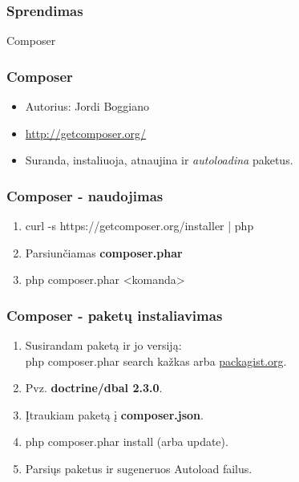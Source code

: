 \documentclass[12pt,a4paper]{beamer}
\begin{document}
\begin{frame}[fragile]
    \frametitle{Sprendimas}

    {\Huge Composer}
\end{frame}

\begin{frame}
    \frametitle{Composer}

    \begin{itemize}
        \item Autorius: Jordi Boggiano
        \item \url{http://getcomposer.org/}
        \item Suranda, instaliuoja, atnaujina ir \textit{autoloadina} paketus.
    \end{itemize}
\end{frame}

\begin{frame}
    \frametitle{Composer - naudojimas}
        \begin{enumerate}
            \item {\color{orange}curl -s https://getcomposer.org/installer | php} 
            \item Parsiunčiamas \textbf{composer.phar}
            \item {\color{orange}php composer.phar <komanda>}
        \end{enumerate}
\end{frame}

\begin{frame}
    \frametitle{Composer - paketų instaliavimas}

    \begin{enumerate}
        \item Susirandam paketą ir jo versiją:\\{\color{orange}php composer.phar search kažkas} arba \url{packagist.org}.
        \item Pvz. \textbf{doctrine/dbal 2.3.0}.
        \item Įtraukiam paketą į \textbf{composer.json}.
        \item {\color{orange}php composer.phar install} (arba {\color{orange}update}).
        \item Parsiųs paketus ir sugeneruos Autoload failus.
    \end{enumerate}
\end{frame}
\end{document}
